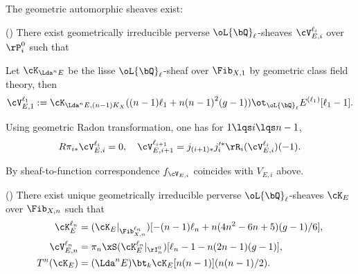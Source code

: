 \documentclass[a4paper, twoside]{article}
\begin{document}
\begin{cnj}
	The geometric automorphic sheaves exist:

	(\cite[4.3.3]{Laumon1987Correspondance}) There exist geometrically irreducible perverse $\oL{\bQ}_{\ell}$-sheaves $\cV_{E,i}^{\ell_{i}}$ over $\rP_{i}^{0}$ such that
	\begin{itm}
		\item Let $\cK_{\Lda^{n}E}$ be the lisse $\oL{\bQ}_{\ell}$-sheaf over $\Fib_{X,1}$ by geometric class field theory, then
		\[
			\cV_{E,1}^{\ell_{1}}:=\cK_{\Lda^{n}E,(n-1)K_{X}}((n-1)\ell_{1}+n{(n-1)}^{2}(g-1))\ot_{\oL{\bQ}_{\ell}}E^{(\ell_{1})}[\ell_{1}-1].
		\]
		\item Using geometric Radon transformation, one has for $1\lqs i\lqs n-1$,
		\[
			R\pi_{i*}\cV_{E,i}^{\ell_{i}}=0,\quad \cV_{E,i+1}^{\ell_{i+1}}=j_{(i+1)*}j_{i}^{\prime*}\rR_{i}(\cV_{E,i}^{\ell_{i}})(-1).
		\]
		\item By sheaf-to-function correspondence $f_{\cV_{E,i}}$ coincides with $V_{E,i}$ above.
	\end{itm}

	(\cite[5.3.1]{Laumon1987Correspondance}) There exist unique geometrically irreducible perverse $\oL{\bQ}_{\ell}$-sheaves $\cK_{E}$ over $\Fib_{X,n}$ such that
	\begin{align*}
	  \cK_{E}^{\ell_{n}} &= (\cK_{E}|_{\Fib_{X,n}^{\ell_{n}}})[-(n-1)\ell_{n}+n(4n^{2}-6n+5)(g-1)/6],\\
	  \cV_{E,n}^{\ell_{n}} &= \pi_{n}\xS(\cK_{E}^{\ell_{n}}|_{\rI_{n}^{0}})[\ell_{n}-1-n(2n-1)(g-1)], \\
	  T^{n}(\cK_{E})&=(\Lda^{n}E)\bt_{k}\cK_{E}[n(n-1)](n(n-1)/2).
	\end{align*}
\end{cnj}


\printref
\end{document}
